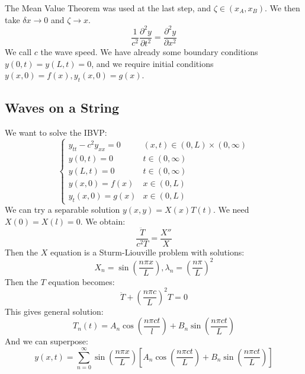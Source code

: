 \documentclass[../Main.tex]{subfiles}
\begin{document}
The Mean Value Theorem was used at the last step, and $\zeta \in (x_A, x_B)$. We then take $\delta x \to 0$ and $\zeta \to x$.
\begin{equation}
    \frac{1}{c^2} \frac{\partial^{2}y}{\partial t^{2}} = \frac{\partial^{2}y}{\partial x^{2}}
    \label{eqnWave}
\end{equation}
We call $c$ the wave speed. We have already some boundary conditions $y(0, t) = y(L, t) = 0$, and we require initial conditions $y(x, 0) = f(x), y_t(x, 0) = g(x)$.
\subsection{Waves on a String}
We want to solve the IBVP:
\begin{equation*}
    \begin{cases}
        y_{tt} - c^2y_{xx} = 0 & (x, t) \in (0, L) \times (0, \infty) \\
        y(0, t) = 0 & t \in (0, \infty) \\
        y(L, t) = 0 & t \in (0, \infty) \\
        y(x, 0) = f(x) & x \in (0, L) \\
        y_t(x, 0) = g(x) & x \in (0, L)
    \end{cases}
\end{equation*}
We can try a separable solution $y(x, y) = X(x) T(t)$. We need $X(0) = X(l) = 0$. We obtain:
\begin{equation}
    \frac{\ddot{T}}{c^2T} = \frac{X''}{X}
    \label{eqnWaveSeparated}
\end{equation}
Then the $X$ equation is a Sturm-Liouville problem with solutions:
\begin{equation*}
    X_n = \sin\left(\frac{n\pi x}{L}\right), \lambda_n = \left(\frac{n\pi}{L}\right)^2
\end{equation*}
Then the $T$ equation becomes:
\begin{equation*}
    \ddot{T} + \left(\frac{n\pi c}{L}\right)^2 T = 0
\end{equation*}
This gives general solution:
\begin{equation*}
    T_n(t) = A_n \cos\left(\frac{n\pi c t}{l}\right) + B_n \sin\left(\frac{n\pi c t}{L}\right)
\end{equation*}
And we can superpose:
\begin{equation}
    y(x, t) = \sum_{n=0}^{\infty} \sin\left(\frac{n\pi x}{L}\right)\left[A_n \cos\left(\frac{n\pi c t}{L}\right) + B_n \sin\left(\frac{n \pi c t}{L}\right)\right]
    \label{eqnWaveSolution}
\end{equation}
\end{document}
